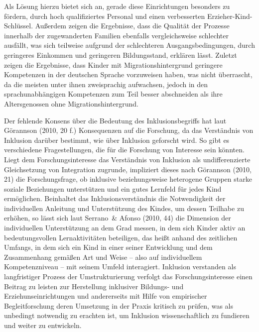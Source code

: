 Als Lösung hierzu bietet sich an, gerade diese Einrichtungen besonders zu fördern, durch hoch qualifiziertes Personal und einen verbesserten
Erzieher-Kind-Schlüssel. Außerdem zeigen die Ergebnisse, dass die Qualität der Prozesse innerhalb der zugewanderten Familien ebenfalls vergleichsweise schlechter ausfällt, was sich teilweise aufgrund der schlechteren Ausgangsbedingungen, durch geringeres Einkommen und geringeren Bildungsstand, erklären lässt. 
Zuletzt zeigen die Ergebnisse, dass Kinder mit Migrationshintergrund geringere Kompetenzen in der deutschen Sprache vorzuweisen haben, was nicht überrascht, da die meisten unter ihnen zweisprachig aufwachsen, jedoch in den sprachunabhängigen Kompetenzen zum Teil besser abschneiden als ihre Altersgenossen ohne Migrationshintergrund.
  
Der fehlende Konsens über die Bedeutung des Inklusionsbegriffs hat laut Görannson (2010, 20 f.) Konsequenzen auf die Forschung, da das Verständnis von Inklusion darüber bestimmt, wie über Inklusion geforscht wird. So gibt es verschiedene Fragestellungen, die für die Forschung von Interesse sein könnten. Liegt dem Forschungsinteresse das Verständnis von Inklusion als undifferenzierte Gleichsetzung von Integration zugrunde, impliziert dieses nach Görannson (2010, 21) die Forschungsfrage, ob inklusive beziehungsweise heterogene Gruppen starke soziale Beziehungen unterstützen und ein gutes Lernfeld für jedes Kind ermöglichen. Beinhaltet das Inklusionsverständnis die Notwendigkeit der individuellen Anleitung und Unterstützung des Kindes, um dessen Teilhabe zu erhöhen, so lässt sich laut Serrano~\& Afonso (2010, 44) die Dimension der individuellen Unterstützung an dem Grad messen, in dem sich Kinder aktiv an bedeutungsvollen Lernaktivitäten beteiligen, das heißt anhand des zeitlichen Umfangs, in dem sich ein Kind in einer seiner Entwicklung und dem Zusammenhang gemäßen Art und Weise -- also auf individuellem Kompetenzniveau -- mit seinem Umfeld interagiert.
Inklusion verstanden als langfristiger Prozess der Umstrukturierung verfolgt das Forschungsinteresse einen Beitrag zu leisten zur Herstellung inklusiver Bildungs- und Erziehunseinrichtungen und  andererseits mit Hilfe von empirischer Begleitforschung deren Umsetzung in der Praxis kritisch zu prüfen, was als unbedingt notwendig zu erachten ist, um Inklusion wissenschaftlich zu fundieren und weiter zu entwickeln.

